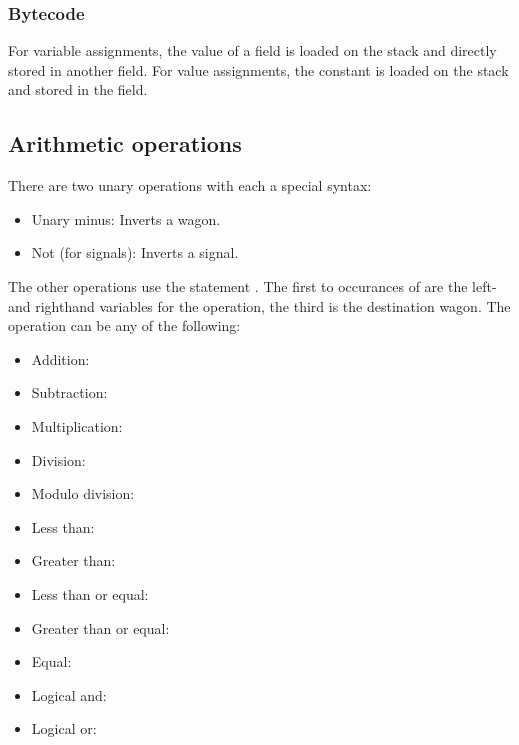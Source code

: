\subsubsection*{Bytecode}

For variable assignments, the value of a field is loaded on the stack and directly stored in another field. For value assignments, the constant is loaded on the stack and stored in the field.

\subsection{Arithmetic operations}

There are two unary operations with each a special syntax:

\begin{itemize}
\item Unary minus: Inverts a wagon. \\ 
\item Not (for signals): Inverts a signal. \\ 
\end{itemize}

The other operations use the statement . The first to occurances of  are the left- and righthand variables for the operation, the third  is the destination wagon. The operation  can be any of the following:

\begin{itemize}
\item Addition: 
\item Subtraction: 
\item Multiplication: 
\item Division: 
\item Modulo division: 
\item Less than: 
\item Greater than: 
\item Less than or equal: 
\item Greater than or equal: 
\item Equal: 
\item Logical and: 
\item Logical or: 
\end{itemize}

